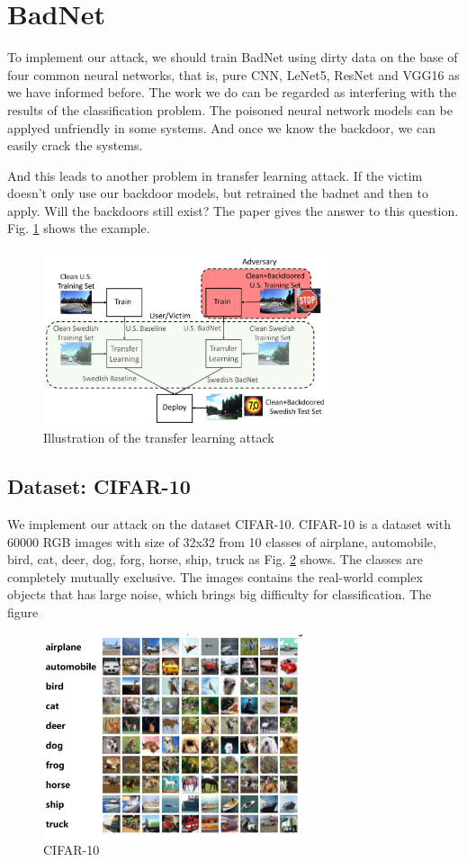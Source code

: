 \documentclass[runningheads]{llncs}
\begin{document}
\section{BadNet}

To implement our attack, we should train BadNet using dirty data on the base of four common neural networks, that is, pure CNN, LeNet5, ResNet and VGG16 as we have informed before. The work we do can be regarded as interfering with the results of the classification problem. The poisoned neural network models can be applyed unfriendly in some systems. And once we know the backdoor, we can easily crack the systems.

And this leads to another problem in transfer learning attack. If the victim doesn't only use our backdoor models, but retrained the badnet and then to apply. Will the backdoors still exist? The paper\cite{gu2017badnets} gives the answer to this question. Fig. \ref{transfer} shows the example.

\begin{figure}[h]
	\centering
	\includegraphics[width=3.3in]{figures/transfer.png}
	\caption{Illustration of the transfer learning attack} \label{transfer}
\end{figure}

\subsection{Dataset: CIFAR-10}
We implement our attack on the dataset CIFAR-10\cite{krizhevsky2009learning}. CIFAR-10 is a dataset with 60000 RGB images with size of 32x32 from 10 classes of airplane, automobile, bird, cat, deer, dog, forg, horse, ship, truck as Fig. \ref{dialog} shows. The classes are completely mutually exclusive. The images contains the real-world complex objects that has large noise, which brings big difficulty for classification. The figure

\begin{figure}[h]
	\centering
	\includegraphics[width=3.0in]{figures/cifar10.png}
	\caption{CIFAR-10} \label{dialog}
\end{figure}
\end{document}
